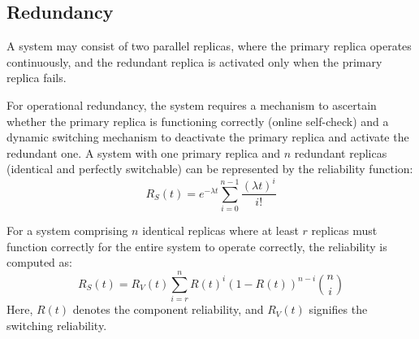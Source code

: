 \subsection{Redundancy}
A system may consist of two parallel replicas, where the primary replica operates continuously, and the redundant replica is activated only when the primary replica fails.

For operational redundancy, the system requires a mechanism to ascertain whether the primary replica is functioning correctly (online self-check) and a dynamic switching mechanism to deactivate the primary replica and activate the redundant one.
A system with one primary replica and $n$ redundant replicas (identical and perfectly switchable) can be represented by the reliability function:
\[R_S(t)=e^{-\lambda t}\sum_{i=0}^{n-1}\dfrac{{\left(\lambda t\right)}^i}{i!}\]

For a system comprising $n$ identical replicas where at least $r$ replicas must function correctly for the entire system to operate correctly, the reliability is computed as:
\[R_S(t)=R_V(t)\sum_{i=r}^{n}R(t)^i{(1-R(t))}^{n-i}\binom{n}{i}\]
Here, $R(t)$ denotes the component reliability, and $R_V(t)$ signifies the switching reliability.